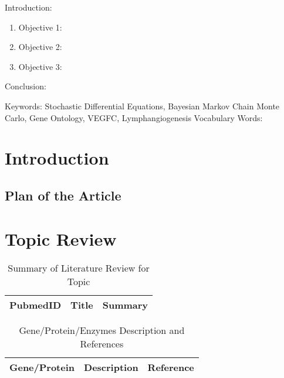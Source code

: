 

\twocolumn
\scriptsize
\begin{frontmatter}
		\title{}
		\author{}
		\address{The Mathematical Learning Space}
\end{frontmatter}	

Introduction:
\begin{enumerate}
\item Objective 1:
\item Objective 2:
\item Objective 3:
\end{enumerate}
Conclusion:

Keywords: Stochastic Differential Equations, Bayesian Markov Chain Monte Carlo, Gene Ontology, VEGFC, Lymphangiogenesis
Vocabulary Words:

\section{Introduction}

\subsection{Plan of the Article}


\section{Topic Review}

\begin{table}[H]
\centering
\begin{tabular}{r|p{12cm}|l}
\hline
PubmedID  & Title & Summary \\
\hline	
\hline
	\end{tabular}
	\caption{Summary of Literature Review for Topic}
\end{table}	

\centering	
\begin{table}[H]\tiny
\caption{Gene/Protein/Enzymes Description and References}	
\begin{tabular}{r|p{3cm}|l}
\hline	
Gene/Protein & Description & Reference \\
\hline 
\hline 
\end{tabular}
\end{table}


